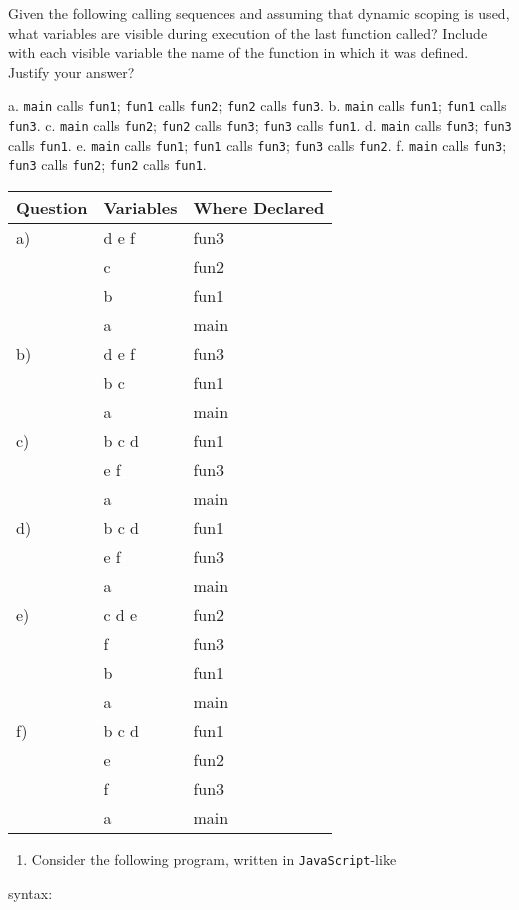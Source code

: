 \documentclass[11pt]{article}
\begin{document}
Given the following calling sequences and assuming that dynamic scoping is used,
what variables are visible during execution of the last function called? Include
with each visible variable the name of the function in which it was defined.
Justify your answer?

a. \texttt{main} calls \texttt{fun1}; \texttt{fun1} calls \texttt{fun2}; \texttt{fun2} calls \texttt{fun3}.
b. \texttt{main} calls \texttt{fun1}; \texttt{fun1} calls \texttt{fun3}.
c. \texttt{main} calls \texttt{fun2}; \texttt{fun2} calls \texttt{fun3}; \texttt{fun3} calls \texttt{fun1}.
d. \texttt{main} calls \texttt{fun3}; \texttt{fun3} calls \texttt{fun1}.
e. \texttt{main} calls \texttt{fun1}; \texttt{fun1} calls \texttt{fun3}; \texttt{fun3} calls \texttt{fun2}.
f. \texttt{main} calls \texttt{fun3}; \texttt{fun3} calls \texttt{fun2}; \texttt{fun2} calls \texttt{fun1}.

\begin{center}
\begin{tabular}{lll}
\hline
Question & Variables & Where Declared\\
\hline
a) & d e f & fun3\\
 & c & fun2\\
 & b & fun1\\
 & a & main\\
\hline
b) & d e f & fun3\\
 & b c & fun1\\
 & a & main\\
\hline
c) & b c d & fun1\\
 & e f & fun3\\
 & a & main\\
\hline
d) & b c d & fun1\\
 & e f & fun3\\
 & a & main\\
\hline
e) & c d e & fun2\\
 & f & fun3\\
 & b & fun1\\
 & a & main\\
\hline
f) & b c d & fun1\\
 & e & fun2\\
 & f & fun3\\
 & a & main\\
\hline
\end{tabular}
\end{center}

\begin{enumerate}
\item Consider the following program, written in \texttt{JavaScript}-like
\end{enumerate}
syntax:
\end{document}
